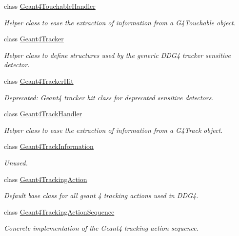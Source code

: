 \begin{DoxyCompactItemize}
class \hyperlink{class_d_d4hep_1_1_simulation_1_1_geant4_touchable_handler}{Geant4\+Touchable\+Handler}
\begin{DoxyCompactList}\small\item\em Helper class to ease the extraction of information from a G4\+Touchable object. \end{DoxyCompactList}\item 
class \hyperlink{class_d_d4hep_1_1_simulation_1_1_geant4_tracker}{Geant4\+Tracker}
\begin{DoxyCompactList}\small\item\em Helper class to define structures used by the generic D\+D\+G4 tracker sensitive detector. \end{DoxyCompactList}\item 
class \hyperlink{class_d_d4hep_1_1_simulation_1_1_geant4_tracker_hit}{Geant4\+Tracker\+Hit}
\begin{DoxyCompactList}\small\item\em Deprecated\+: Geant4 tracker hit class for deprecated sensitive detectors. \end{DoxyCompactList}\item 
class \hyperlink{class_d_d4hep_1_1_simulation_1_1_geant4_track_handler}{Geant4\+Track\+Handler}
\begin{DoxyCompactList}\small\item\em Helper class to ease the extraction of information from a G4\+Track object. \end{DoxyCompactList}\item 
class \hyperlink{class_d_d4hep_1_1_simulation_1_1_geant4_track_information}{Geant4\+Track\+Information}
\begin{DoxyCompactList}\small\item\em Unused. \end{DoxyCompactList}\item 
class \hyperlink{class_d_d4hep_1_1_simulation_1_1_geant4_tracking_action}{Geant4\+Tracking\+Action}
\begin{DoxyCompactList}\small\item\em Default base class for all geant 4 tracking actions used in D\+D\+G4. \end{DoxyCompactList}\item 
class \hyperlink{class_d_d4hep_1_1_simulation_1_1_geant4_tracking_action_sequence}{Geant4\+Tracking\+Action\+Sequence}
\begin{DoxyCompactList}\small\item\em Concrete implementation of the Geant4 tracking action sequence. \end{DoxyCompactList}\item 

\end{DoxyCompactItemize}
